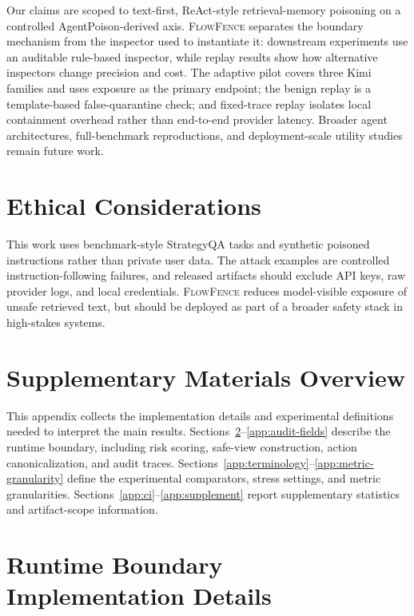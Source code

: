 \documentclass[11pt]{article}
\newcommand{\ff}{\textsc{FlowFence}\xspace}
\begin{document}
Our claims are scoped to text-first, ReAct-style retrieval-memory poisoning on a controlled AgentPoison-derived axis. \ff separates the boundary mechanism from the inspector used to instantiate it: downstream experiments use an auditable rule-based inspector, while replay results show how alternative inspectors change precision and cost. The adaptive pilot covers three Kimi families and uses exposure as the primary endpoint; the benign replay is a template-based false-quarantine check; and fixed-trace replay isolates local containment overhead rather than end-to-end provider latency. Broader agent architectures, full-benchmark reproductions, and deployment-scale utility studies remain future work.

\section*{Ethical Considerations}

This work uses benchmark-style StrategyQA tasks and synthetic poisoned instructions rather than private user data. The attack examples are controlled instruction-following failures, and released artifacts should exclude API keys, raw provider logs, and local credentials. \ff reduces model-visible exposure of unsafe retrieved text, but should be deployed as part of a broader safety stack in high-stakes systems.



\newpage

\appendix

\section{Supplementary Materials Overview}

This appendix collects the implementation details and experimental definitions needed to interpret the main results. Sections~\ref{app:implementation}--\ref{app:audit-fields} describe the runtime boundary, including risk scoring, safe-view construction, action canonicalization, and audit traces. Sections~\ref{app:terminology}--\ref{app:metric-granularity} define the experimental comparators, stress settings, and metric granularities. Sections~\ref{app:ci}--\ref{app:supplement} report supplementary statistics and artifact-scope information.

\section{Runtime Boundary Implementation Details}
\label{app:implementation}
\end{document}
